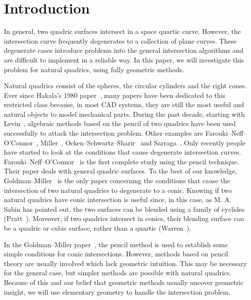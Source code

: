 
\section{Introduction}
\label{section:introduction}
     In general, two quadric surfaces intersect in a space quartic curve.
However, the intersection curve frequently degenerates to a collection of
plane curves.  These degenerate cases
introduce problems into the general intersection algorithms and are difficult 
to implement in a reliable way.  In this paper, we will investigate this 
problem for natural quadrics, using fully geometric methods. 

     Natural quadrics consist of the spheres, the circular cylinders and 
the right cones.  Ever since Hakala's 1980 paper~\cite{hakala:1980}, many 
papers have been dedicated to this restricted class because, in most CAD 
systems, they are still the most useful and natural objects to model 
mechanical parts.  During the past decade, starting with 
Levin~\cite{levin:1976,levin:1979}, algebraic methods based on the pencil of 
two quadrics have been used successfully to attack the intersection problem.  
Other examples are Farouki--Neff--O'Connor~\cite{farouki:1989},
Miller~\cite{miller:1987}, 
Ocken--Schwartz--Sharir~\cite{ocken:1987} and Sarraga~\cite{sarraga:1983}.  
Only recently people have started to look at the conditions that cause 
degenerate intersection curves.  Farouki--Neff--O'Connor~\cite{farouki:1989}
is the first complete study using the pencil technique.  Their paper deals 
with general quadric surfaces.  To the best of 
our knowledge, Goldman--Miller~\cite{goldman:1990} is the only paper 
concerning the conditions that cause the intersection of two natural quadrics 
to degenerate to a conic.  Knowing if two natural quadrics have conic
intersection is useful since, in this case, as M. A. Sabin has pointed out,
the two surfaces can be blended using a family of cyclides 
(Pratt~\cite{pratt:1990}).  Moreover, if two quadrics intersect in conics, 
their blending surface can be a quadric or cubic surface, rather than a
quartic (Warren~\cite{warren:1987}).


     In the Goldman--Miller paper~\cite{goldman:1990}, the pencil method is 
used to establish some simple conditions for conic intersections.  
However, methods based on pencil theory are usually involved which lack 
geometric intuition.  This may be necessary for the general case,
but simpler methods are possible with natural quadrics.  Because of this and 
our belief that geometric methods usually uncover geometric insight, we will 
use elementary geometry to handle the intersection problem.

